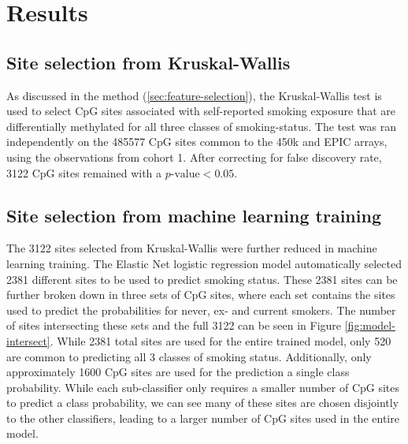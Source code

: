\documentclass{article}
\begin{document}
\section{Results} \label{sec:results}

\subsection{Site selection from Kruskal-Wallis}
As discussed in the method (\ref{sec:feature-selection}), the Kruskal-Wallis test is used to select CpG sites associated with self-reported smoking exposure that are differentially methylated for all three classes of smoking-status. The test was ran independently on the \num{485577} CpG sites common to the 450k and EPIC arrays, using the observations from cohort 1. After correcting for false discovery rate, \num{3122} CpG sites remained with a \(p\text{-value} < 0.05\).


\subsection{Site selection from machine learning training}
The \num{3122} sites selected from Kruskal-Wallis were further reduced in machine learning training. The Elastic Net logistic regression model automatically selected \num{2381} different sites to be used to predict smoking status. These \num{2381} sites can be further broken down in three sets of CpG sites, where each set contains the sites used to predict the probabilities for never, ex- and current smokers. The number of sites intersecting these sets and the full \num{3122} can be seen in Figure \ref{fig:model-intersect}. While \num{2381} total sites are used for the entire trained model, only \num{520} are common to predicting all 3 classes of smoking status. Additionally, only approximately 1600 CpG sites are used for the prediction a single class probability. While each sub-classifier only requires a smaller number of CpG sites to predict a class probability, we can see many of these sites are chosen disjointly to the other classifiers, leading to a larger number of CpG sites used in the entire model. 
\end{document}
